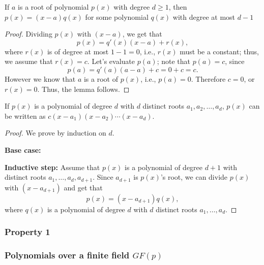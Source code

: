 \begin{frame}
  \begin{lemma}
    If $a$ is a root of polynomial $p(x)$ with degree $d\geq 1$, then
    $p(x)=(x-a)q(x)$ for some polynomial $q(x)$ with degree at most
    $d-1$
  \end{lemma}
  \begin{proof}
    \pause
    Dividing $p(x)$ with $(x-a)$, we get that
    \[
    p(x) = q'(x)(x-a) + r(x),
    \]
    where $r(x)$ is of degree at most $1-1=0$, i.e., $r(x)$ must be a
    constant; thus, we assume that $r(x)=c$.  Let's evaluate $p(a)$; note
    that $p(a)=c$, since
    \[
    p(a) = q'(a)(a-a) + c = 0 + c = c.
    \]
    However we know that $a$ is a root of $p(x)$, i.e., $p(a)=0$.
    Therefore $c=0$, or $r(x)=0$.  Thus, the lemma follows.
  \end{proof}
\end{frame}

\begin{frame}
  \begin{lemma}
    If $p(x)$ is a polynomial of degree $d$ with $d$ distinct roots
    $a_1,a_2,\ldots,a_d$, $p(x)$ can be written as
    $c(x-a_1)(x-a_2)\cdots(x-a_d)$.
  \end{lemma}
  \begin{proof}
    {\small
      \pause
      We prove by induction on $d$. \pause
      
      {\bf Base case:}
      \pause

      {\bf Inductive step:} \pause Assume that $p(x)$ is a polynomial
      of degree $d+1$ with distinct roots $a_1,\ldots,a_d,a_{d+1}$.
      \pause Since $a_{d+1}$ is $p(x)$'s root, we can divide $p(x)$
      with $(x-a_{d+1})$ and get that
      \[
      p(x) = (x-a_{d+1})q(x),
      \]
      where \pause $q(x)$ is a polynomial of degree $d$ with $d$
      distinct roots $a_1,\ldots,a_d$. 
      \vspace{0.5in}
    }
  \end{proof}
\end{frame}

\begin{frame}
  \frametitle{Property 1}
\end{frame}

\begin{frame}
  \frametitle{Polynomials over a finite field $GF(p)$}
\end{frame}


